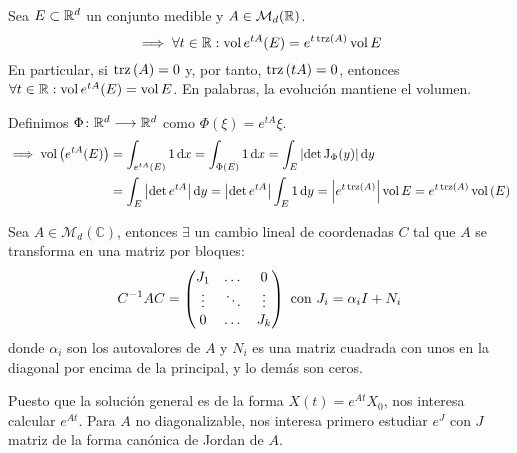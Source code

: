 \begin{cor}[Liouville]
	Sea $E \subset \mathbb{R}^d$ un conjunto medible y $A \in \mathcal{M}_d(\mathbb{R})$.
	\[\implies \forall t \in \mathbb{R} : \operatorname{vol}{e^{tA}(E)} = e^{t\operatorname{trz}\left(A\right)} \operatorname{vol}{E}\]
	En particular, si $\operatorname{trz}\left(A\right) =0$ y, por tanto, $\operatorname{trz}\left(tA\right) = 0$, entonces $\forall t \in \mathbb{R} : \operatorname{vol}{e^{tA}(E)} = \operatorname{vol}{E}$. En palabras, la evolución mantiene el volumen.
	\begin{dem}
		Definimos $\Phi \colon \mathbb{R}^d \longrightarrow \mathbb{R}^d$ como $\Phi(\xi) = e^{tA}\xi$.
		\[\begin{aligned}
				\implies \vol{\left(e^{tA} (E)\right)} & = \int_{e^{tA}(E)} 1 \odif{x} = \int_{\Phi(E)} 1 \odif{x} = \int_{E} \left|\det{\operatorname{J}_\Phi(y)}\right| \odif{y}                    \\
				                                       & = \int_{E} \left|\det{e^{tA}}\right| \odif{y} = \abs{\det{e^{tA}}} \int_{E} 1 \odif{y} = \abs{e^{t\trz{A}}} \vol{E} = e^{t\trz{A}} \vol{(E)}
			\end{aligned}\]
	\end{dem}
\end{cor}

\begin{teo}
	Sea $A \in \mathcal{M}_d(\mathbb{C})$, entonces $\exists$ un cambio lineal de coordenadas $C$ tal que $A$ se transforma en una matriz por bloques:
	\[C^{-1} A C = \begin{pmatrix}
			J_1    & \dots  & 0      \\
			\vdots & \ddots & \vdots \\
			0      & \dots  & J_k
		\end{pmatrix} \text{ con } J_i = \alpha_i I + N_i\]
	donde $\alpha_i$ son los autovalores de $A$ y $N_i$ es una matriz cuadrada con unos en la diagonal por encima de la principal, y lo demás son ceros.
\end{teo}


Puesto que la solución general es de la forma $X(t) = e^{At}X_0$, nos interesa calcular $e^{At}$. Para $A$ no diagonalizable, nos interesa primero estudiar $e^{J}$ con $J$ matriz de la forma canónica de Jordan de $A$.


